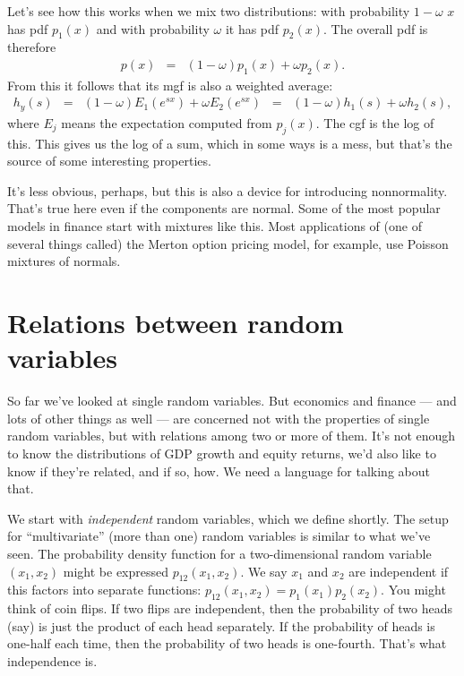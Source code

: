 Let's see how this works when we mix two distributions:
with probability $1-\omega$ $x$ has pdf $p_1(x)$
and with probability $\omega$ it has pdf $p_2(x)$.
The overall pdf is therefore
\begin{eqnarray*}
    p (x) &=& (1-\omega) p_1(x) + \omega p_2 (x) .
\end{eqnarray*}
From this it follows that its mgf is also a weighted average:
\begin{eqnarray*}
    h_y(s) &=& (1-\omega) E_1 \left( e^{sx} \right)
                + \omega  E_2 \left( e^{sx} \right)
            \;\;=\;\; (1-\omega) h_1(s) + \omega h_2 (s) ,
\end{eqnarray*}
where $E_j$ means the expectation computed from $p_j(x)$.
The cgf is the log of this.
This gives us the log of a sum, which in some ways is a mess,
but that's the source of some interesting properties.

It's less obvious, perhaps, but this is also a device for introducing nonnormality.
That's true here even if the components are normal.
Some of the most popular models in finance start with mixtures like this.
Most applications of (one of several things called) the Merton option pricing model,
for example, use Poisson mixtures of normals.


\section{Relations between random variables}

So far we've looked at single random variables.
But economics and finance --- and lots of other things as well ---
are concerned not with the properties
of single random variables, but with relations among two or more of them.
It's not enough to know the distributions of GDP growth
and equity returns,
we'd also like to know if they're related, and if so, how.
We need a language for talking about that.
%

We start with {\it independent\/} random variables,
which we define shortly.
The setup for ``multivariate'' (more than one) random variables
is similar to what we've seen.
The probability density function for a two-dimensional random variable
$(x_1,x_2)$ might be expressed $p_{12}(x_1,x_2)$.
We say $x_1$ and $x_2$ are independent if this factors into separate functions:
$p_{12}(x_1,x_2) = p_1(x_1) p_2(x_2) $.
You might think of coin flips.
If two flips are independent, then the probability of two heads (say)
is just the product of each head separately.
If the probability of heads is one-half each time,
then the probability of two heads is one-fourth.
That's what independence is.

